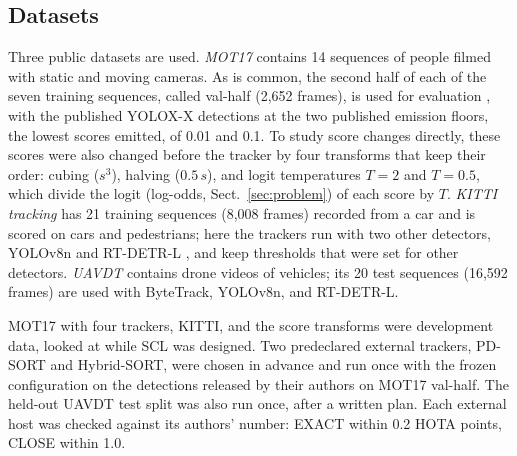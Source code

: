 \documentclass[pdflatex,sn-mathphys-num,iicol]{sn-jnl}
\newcommand{\scl}{SCL}
\begin{document}
\subsection{Datasets}\label{sec:data}
Three public datasets are used. \emph{MOT17} \cite{milan2016mot16} contains 14 sequences of
people filmed with static and moving cameras. As is common, the second half of each of the seven
training sequences, called val-half (2,652 frames), is used for evaluation \cite{zhang2022bytetrack},
with the published YOLOX-X detections \cite{ge2021yolox} at the two published emission floors, the
lowest scores emitted, of 0.01 and 0.1. To study score changes directly, these scores were also
changed before the tracker by four transforms that keep their order: cubing ($s^3$), halving
($0.5\,s$), and logit temperatures $T=2$ and $T=0.5$, which divide the logit (log-odds, Sect.~\ref{sec:problem}) of each score by $T$.
\emph{KITTI tracking} \cite{geiger2012kitti} has 21 training sequences (8,008 frames) recorded from
a car and is scored on cars and pedestrians; here the trackers run with two other detectors,
YOLOv8n \cite{jocher2023yolov8} and RT-DETR-L \cite{zhao2024rtdetr}, and keep thresholds that were
set for other detectors. \emph{UAVDT} \cite{du2018uavdt} contains drone videos of vehicles; its 20
test sequences (16,592 frames) are used with ByteTrack, YOLOv8n, and RT-DETR-L.

MOT17 with four trackers, KITTI, and the score transforms were development data, looked at while
\scl{} was designed. Two predeclared external trackers, PD-SORT and Hybrid-SORT, were chosen in
advance and run once with the frozen configuration on the detections released by their authors on
MOT17 val-half. The held-out UAVDT test split was also run once, after a written plan. Each
external host was checked against its authors' number: EXACT within 0.2 HOTA points, CLOSE within
1.0.
\end{document}
